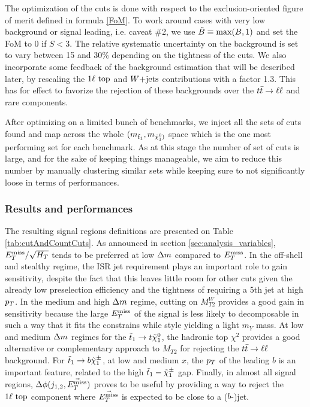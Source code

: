     The optimization of the cuts is done with respect to the exclusion-oriented figure of
    merit defined in formula \ref{FoM}. To work around cases with very low background or signal leading,
    i.e. caveat \#2, we use $\tilde{B} \equiv \text{max}(B,1)$ and set the FoM to 0
    if $S < 3$. The relative systematic uncertainty on the background is set to vary between
    15 and 30\% depending on the tightness of the cuts. We also incorporate some feedback
    of the background estimation that will be described later, by rescaling the $1\ell~\text{top}$
    and $\text{$W$+jets}$ contributions with a factor 1.3. This has for effect to favorize the
    rejection of these backgrounds over the $t\bar{t} \rightarrow \ell \ell$ and rare components.

    After optimizing on a limited bunch of benchmarks, we inject all the sets of cuts found
    and map across the whole $(m_{\tilde{t}_1},m_{\tilde{\chi}_1^0)}$ space which is the one
    most performing set for each benchmark. As at this stage the number of set of cuts is
    large, and for the sake of keeping things manageable, we aim to reduce this number by
    manually clustering similar sets while keeping sure to not significantly loose in
    terms of performances.

            \subsubsection{Results and performances}

    The resulting signal regions definitions are presented on Table \ref{tab:cutAndCountCuts}.
    As announced in section \ref{sec:analysis_variables}, $E_T^\text{miss}/\sqrt{H_T}$ tends to be
    preferred at low $\Delta m$ compared to $E_T^\text{miss}$. In the off-shell and stealthy regime,
    the ISR jet requirement plays an important role to gain sensitivity, despite the
    fact that this leaves little room for other cuts given the already low preselection
    efficiency and the tightness of requiring a 5th jet at high $p_T$.
    In the medium and high $\Delta m$ regime, cutting on $M_{T2}^W$ provides a good gain
    in sensitivity because the large $E_T^\text{miss}$ of the signal is less likely to decomposable
    in such a way that it fits the constrains while style yielding a light $m_Y$ mass.
    At low and medium $\Delta m$ regimes for the $\tilde{t}_1 \rightarrow t \tilde{\chi}_1^0$, the
    hadronic top $\chi^2$ provides a good alternative or complementary approach to $M_{T2}$
    for rejecting the $t\bar{t} \rightarrow \ell \ell$ background. For $\tilde{t}_1 \rightarrow b \tilde{\chi}_1^\pm$,
    at low and medium $x$, the $p_T$ of the leading $b$ is an important feature, related
    to the high $\tilde{t}_1-\tilde{\chi}_1^\pm$ gap. Finally, in almost all signal regions,
    $\Delta\phi(j_{1,2},\vec{E_T^\text{miss}})$ proves to be useful by providing a way to reject the
    $1\ell~\text{top}$ component where $\vec{E_T^\text{miss}}$ is expected to be close to a ($b$-)jet.

